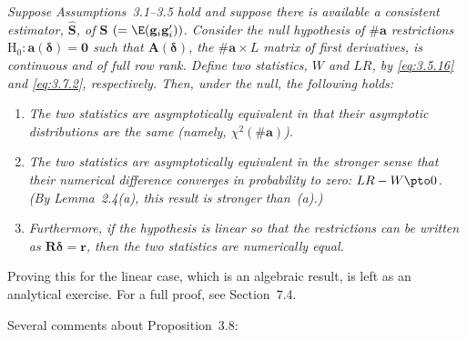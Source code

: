 \begin{proposition}
\label{prop:3.8}
\emph{Suppose Assumptions~3.1--3.5 hold and suppose there is available a consistent estimator,
$\hat{\mathbf{S}}$, of $\mathbf{S}$ $(= \E(\mathbf{g}_i \mathbf{g}_i'))$.
Consider the null hypothesis of $\#\mathbf{a}$ restrictions $\mathrm{H}_0\colon
\mathbf{a}(\boldsymbol{\delta}) = \mathbf{0}$ such that $\mathbf{A}(\boldsymbol{\delta})$, the
$\#\mathbf{a} \times L$ matrix of first derivatives, is continuous and of full row rank.  Define two
statistics, $W$ and $LR$, by \eqref{eq:3.5.16} and \eqref{eq:3.7.2}, respectively.  Then,
under the null, the following holds:}
\begin{enumerate}[label=(\alph*)]
\item \emph{The two statistics are asymptotically equivalent in that their asymptotic
  distributions are the same (namely, $\chi^2(\#\mathbf{a})$).}

\item \emph{The two statistics are asymptotically equivalent in the stronger sense that their
  numerical difference converges in probability to zero: $LR - W \pto 0$.
  (By Lemma~2.4(a), this result is stronger than~(a).)}

\item \emph{Furthermore, if the hypothesis is linear so that the restrictions can be written as
  $\mathbf{R}\boldsymbol{\delta} = \mathbf{r}$, then the two statistics are numerically equal.}
\end{enumerate}
\end{proposition}

Proving this for the linear case, which is an algebraic result, is left as an analytical
exercise.  For a full proof, see Section~7.4.

Several comments about Proposition~3.8:

